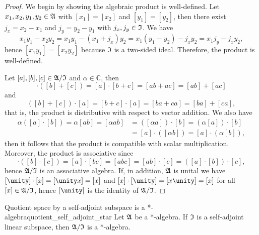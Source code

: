 \begin{proof}
    We begin by showing the algebraic product is well-defined. Let \(x_1, x_2, y_1, y_2 \in \mathfrak{A}\) with \([x_1] = [x_2]\) and \([y_1] = [y_2]\), then there exist \(j_x = x_2 - x_1\) and \(j_y = y_2 - y_1\) with \(j_x, j_y \in \mathfrak{I}\). We have
    \begin{equation*}
        x_1y_1 - x_2 y_2 = x_1 y_1 - (x_1 + j_x) y_2 = x_1 (y_1 - y_2) - j_x y_2 = x_1 j_y - j_x y_2,
    \end{equation*}
    hence \([x_1 y_1] = [x_2 y_2]\) because \(\mathfrak{I}\) is a two-sided ideal. Therefore, the product is well-defined.

    Let \([a], [b], [c] \in \mathfrak{A}/\mathfrak{I}\) and \(\alpha \in \mathbb{C}\), then
    \begin{equation*}
        [a] \cdot ([b]+[c]) = [a]\cdot[b+c] = [ab + ac] = [ab] + [ac]
    \end{equation*}
    and
    \begin{equation*}
        ([b]+[c])\cdot[a] = [b+c]\cdot[a] = [ba + ca] = [ba] + [ca],
    \end{equation*}
    that is, the product is distributive with respect to vector addition. We also have
    \begin{align*}
        \alpha([a]\cdot[b]) = \alpha[ab] = [\alpha ab] &= ([\alpha a])\cdot[b] = (\alpha[a])\cdot[b]\\
                                                       &= [a]\cdot([\alpha b]) = [a]\cdot (\alpha[b]),
    \end{align*}
    then it follows that the product is compatible with scalar multiplication. Moreover, the product is associative since
    \begin{equation*}
        [a]\cdot([b]\cdot[c]) = [a]\cdot[bc]=[abc] = [ab] \cdot [c] = ([a]\cdot[b])\cdot[c],
    \end{equation*}
    hence \(\mathfrak{A}/\mathfrak{I}\) is an associative algebra. If, in addition, \(\mathfrak{A}\) is unital we have \([\unity]\cdot[x] = [\unity x] = [x]\) and \([x]\cdot[\unity] = [x \unity] = [x]\) for all \([x] \in \mathfrak{A}/\mathfrak{I}\), hence \([\unity]\) is the identity of \(\mathfrak{A}/\mathfrak{I}\).
\end{proof}
\begin{lemma}{Quotient space by a self-adjoint subspace is a *-algebra}{quotient_self_adjoint_star}
    Let \(\mathfrak{A}\) be a *-algebra. If \(\mathfrak{I}\) is a self-adjoint linear subspace, then \(\mathfrak{A}/\mathfrak{I}\) is a *-algebra.
\end{lemma}
